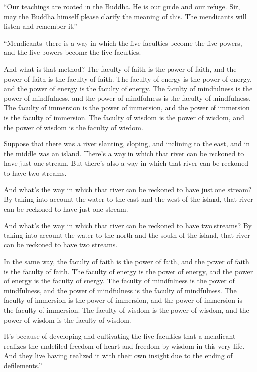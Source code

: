 \documentclass[12pt,openany]{book}%
\begin{document}
“Our teachings are rooted in the Buddha. He is our guide and our refuge. Sir, may the Buddha himself please clarify the meaning of this. The mendicants will listen and remember it.” 

“Mendicants, there is a way in which the five faculties become the five powers, and the five powers become the five faculties. 

And what is that method? The faculty of faith is the power of faith, and the power of faith is the faculty of faith. The faculty of energy is the power of energy, and the power of energy is the faculty of energy. The faculty of mindfulness is the power of mindfulness, and the power of mindfulness is the faculty of mindfulness. The faculty of immersion is the power of immersion, and the power of immersion is the faculty of immersion. The faculty of wisdom is the power of wisdom, and the power of wisdom is the faculty of wisdom. 

Suppose that there was a river slanting, sloping, and inclining to the east, and in the middle was an island. There’s a way in which that river can be reckoned to have just one stream. But there’s also a way in which that river can be reckoned to have two streams. 

And what’s the way in which that river can be reckoned to have just one stream? By taking into account the water to the east and the west of the island, that river can be reckoned to have just one stream. 

And what’s the way in which that river can be reckoned to have two streams? By taking into account the water to the north and the south of the island, that river can be reckoned to have two streams. 

In the same way, the faculty of faith is the power of faith, and the power of faith is the faculty of faith. The faculty of energy is the power of energy, and the power of energy is the faculty of energy. The faculty of mindfulness is the power of mindfulness, and the power of mindfulness is the faculty of mindfulness. The faculty of immersion is the power of immersion, and the power of immersion is the faculty of immersion. The faculty of wisdom is the power of wisdom, and the power of wisdom is the faculty of wisdom. 

It’s because of developing and cultivating the five faculties that a mendicant realizes the undefiled freedom of heart and freedom by wisdom in this very life. And they live having realized it with their own insight due to the ending of defilements.” 
\end{document}
